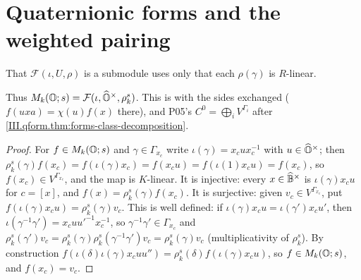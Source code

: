 \section{Quaternionic forms and the weighted pairing}\label{sec:qform-forms}

\begin{definition}
\end{definition}
\noindent That $\mathcal F(\iota,U,\rho)$ is a submodule uses only that each $\rho(\gamma)$ is $R$-linear.

\begin{definition}
\end{definition}
\noindent Thus $M_k(\mathbb{O};s)=\mathcal F(\iota,\widehat{\mathbb{O}}^\times,\rho_k^s)$. This is \cite[§2.2, p.~172]{Shz} with the sides exchanged ($f(uxa)=\chi(u)f(x)$
there), and P05's $C^0=\bigoplus_iV^{\Gamma_i}$ after \cref{III.qform.thm:forms-class-decomposition}.

\begin{theorem}
\end{theorem}
\begin{proof}
For $f\in M_k(\mathbb{O};s)$ and $\gamma\in\Gamma_{x_c}$ write $\iota(\gamma)=x_cux_c^{-1}$ with $u\in\widehat{\mathbb{O}}^\times$; then
$\rho_k^s(\gamma)f(x_c)=f(\iota(\gamma)x_c)=f(x_cu)=f(\iota(1)x_cu)=f(x_c)$, so $f(x_c)\in V^{\Gamma_{x_c}}$, and the map is $K$-linear. It is injective:
every $x\in\widehat{\mathbb{B}}^\times$ is $\iota(\gamma)x_cu$ for $c=[x]$, and $f(x)=\rho_k^s(\gamma)f(x_c)$. It is surjective: given $v_c\in V^{\Gamma_{x_c}}$, put
$f(\iota(\gamma)x_cu)=\rho_k^s(\gamma)v_c$. This is well defined: if $\iota(\gamma)x_cu=\iota(\gamma')x_cu'$, then
$\iota(\gamma^{-1}\gamma')=x_cuu'^{-1}x_c^{-1}$, so $\gamma^{-1}\gamma'\in\Gamma_{x_c}$ and $\rho_k^s(\gamma')v_c=\rho_k^s(\gamma)\rho_k^s(\gamma^{-1}\gamma')v_c=\rho_k^s(\gamma)v_c$
(multiplicativity of $\rho_k^s$). By construction $f(\iota(\delta)\iota(\gamma)x_cuu'')=\rho_k^s(\delta)f(\iota(\gamma)x_cu)$, so $f\in M_k(\mathbb{O};s)$, and
$f(x_c)=v_c$.
\end{proof}

